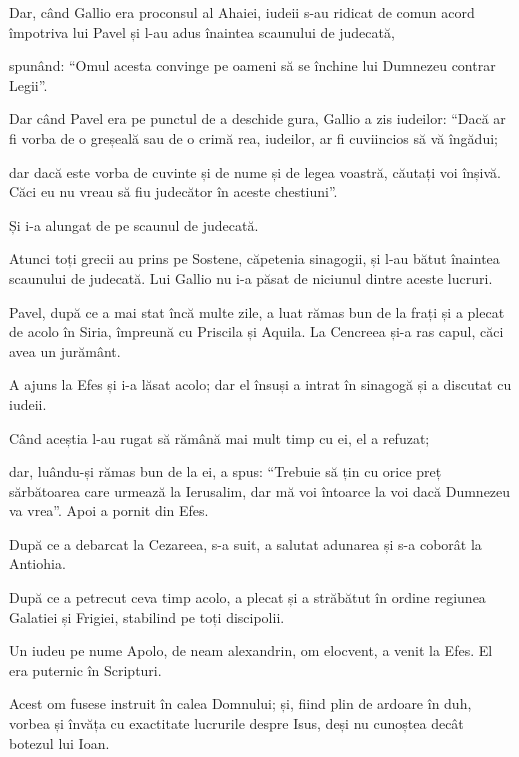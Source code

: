 {Dar, când Gallio era proconsul al Ahaiei, iudeii s-au ridicat de comun acord împotriva lui Pavel și l-au adus înaintea scaunului de judecată,

spunând: “Omul acesta convinge pe oameni să se închine lui Dumnezeu contrar Legii”.


\par }{\PP {}Dar când Pavel era pe punctul de a deschide gura, Gallio a zis iudeilor: “Dacă ar fi vorba de o greșeală sau de o crimă rea, iudeilor, ar fi cuviincios să vă îngădui;

dar dacă este vorba de cuvinte și de nume și de legea voastră, căutați voi înșivă. Căci eu nu vreau să fiu judecător în aceste chestiuni”.

Și i-a alungat de pe scaunul de judecată.


\par }{\PP {}Atunci toți grecii au prins pe Sostene, căpetenia sinagogii, și l-au bătut înaintea scaunului de judecată. Lui Gallio nu i-a păsat de niciunul dintre aceste lucruri.


\par }{\PP {}Pavel, după ce a mai stat încă multe zile, a luat rămas bun de la frați
și a plecat de acolo în Siria, împreună cu Priscila și Aquila. La Cencreea și-a ras capul, căci avea un jurământ.

A ajuns la Efes și i-a lăsat acolo; dar el însuși a intrat în sinagogă și a discutat cu iudeii.

Când aceștia l-au rugat să rămână mai mult timp cu ei, el a refuzat;

dar, luându-și rămas bun de la ei, a spus: “Trebuie să țin cu orice preț sărbătoarea care urmează la Ierusalim, dar mă voi întoarce la voi dacă Dumnezeu va vrea”. Apoi a pornit din Efes.


\par }{\PP {}După ce a debarcat la Cezareea, s-a suit, a salutat adunarea și s-a coborât la Antiohia.

După ce a petrecut ceva timp acolo, a plecat și a străbătut în ordine regiunea Galatiei și Frigiei, stabilind pe toți discipolii.

Un iudeu pe nume Apolo, de neam alexandrin, om elocvent, a venit la Efes. El era puternic în Scripturi.

Acest om fusese instruit în calea Domnului; și, fiind plin de ardoare în duh, vorbea și învăța cu exactitate lucrurile despre Isus, deși nu cunoștea decât botezul lui Ioan.

}
